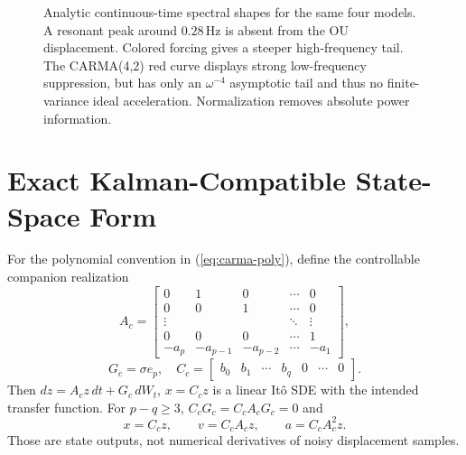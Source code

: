 \documentclass[10pt,journal]{IEEEtran}
\newcommand{\Hz}{\,\mathrm{Hz}}
\begin{document}
\begin{figure}[t]
\centering
{}
\caption{Analytic continuous-time spectral shapes for the same
four models. A resonant peak around \(0.28\Hz\) is absent
from the OU displacement. Colored forcing gives a steeper
high-frequency tail. The CARMA(4,2) red curve displays
strong low-frequency suppression, but has only an
\(\omega^{-4}\) asymptotic tail and thus no finite-variance
ideal acceleration. Normalization removes absolute power information.}
\label{fig:spectra}
\end{figure}

\section{Exact Kalman-Compatible State-Space Form}
For the polynomial convention in (\ref{eq:carma-poly}), define
the controllable companion realization
\begin{equation}
A_c=\begin{bmatrix}
0&1&0&\cdots&0\\
0&0&1&\cdots&0\\
\vdots&&&\ddots&\vdots\\
0&0&0&\cdots&1\\
-a_p&-a_{p-1}&-a_{p-2}&\cdots&-a_1
\end{bmatrix},
\label{eq:companion}
\end{equation}
\begin{equation}
G_c=\sigma e_p,\quad
C_c=\begin{bmatrix}b_0&b_1&\cdots&b_q&0&\cdots&0\end{bmatrix}.
\label{eq:companion-out}
\end{equation}
Then \(d z=A_cz\,dt+G_c\,dW_t\), \(x=C_cz\)
is a linear It\^o SDE with the intended transfer function.
For \(p-q\ge3\), \(C_cG_c=C_cA_cG_c=0\) and
\begin{equation}
\boxed{x=C_cz,\qquad v=C_cA_cz,\qquad
a=C_cA_c^2z.}
\label{eq:xva}
\end{equation}
Those are state outputs, not numerical derivatives of noisy
displacement samples.
\end{document}
